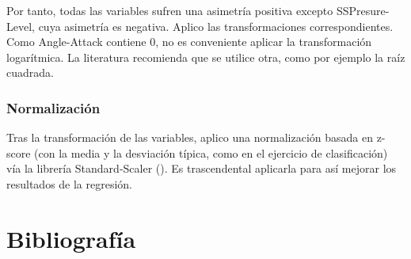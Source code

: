 Por tanto, todas las variables sufren una asimetría positiva excepto SSPresure-Level, cuya asimetría es negativa. Aplico las transformaciones correspondientes. Como Angle-Attack contiene 0, no es conveniente aplicar la transformación logarítmica. La literatura recomienda que se utilice otra, como por ejemplo la raíz cuadrada.

\subsubsection{Normalización}

Tras la transformación de las variables, aplico una normalización basada en z-score (con la media y la desviación típica, como en el ejercicio de clasificación) vía la librería Standard-Scaler (\cite{st-sc}). Es trascendental aplicarla para así mejorar los resultados de la regresión.

\newpage
\section{Bibliografía}




